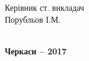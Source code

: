 \documentclass[../main.tex]{subfiles}
\begin{document}
\begin{titlepage}
{\begin{flushright}
\begin{minipage}[t]{4.2cm}
				\end{minipage}
			\end{flushright}
		\begin{flushright}
			\begin{minipage}[t]{6.8cm}
				\begin{flushright}
					Керівник ст. викладач \\
					Порубльов І.М. \\
					\hrulefill \\
				\end{flushright}
			\end{minipage}
		\end{flushright}
		}
		\vfill
		{\centering\bfseries Черкаси -- 2017 \\ }
	\end{titlepage}
	
\end{document}
